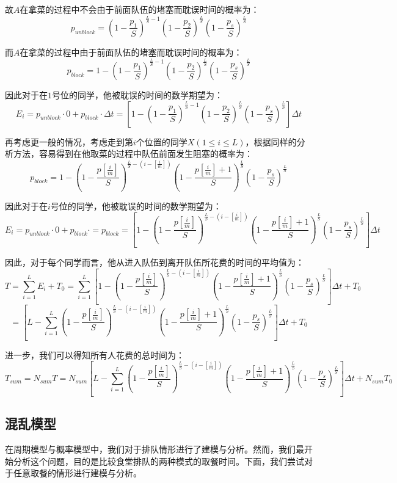 \documentclass[lang=cn,10pt,a4paper]{elegantpaper}
\begin{document}
故$A$在拿菜的过程中不会由于前面队伍的堵塞而耽误时间的概率为：
$$
p_{unblock} = (1-\frac{p_1}{S})^{\frac{L}{S}-1}(1-\frac{p_2}{S})^{\frac{L}{S}}(1-\frac{p_s}{S})^{\frac{L}{S}}
$$


而$A$在拿菜的过程中由于前面队伍的堵塞而耽误时间的概率为：
$$
p_{block} = 1-(1-\frac{p_1}{S})^{\frac{L}{S}-1}(1-\frac{p_2}{S})^{\frac{L}{S}}(1-\frac{p_s}{S})^{\frac{L}{S}}
$$


因此对于在$1$号位的同学，他被耽误的时间的数学期望为：
$$
E_i=p_{unblock} \cdot 0+p_{block} \cdot \Delta t = [1-(1-\frac{p_1}{S})^{\frac{L}{S}-1}(1-\frac{p_2}{S})^{\frac{L}{S}}(1-\frac{p_s}{S})^{\frac{L}{S}}]\Delta t
$$


再考虑更一般的情况，考虑走到第$i$个位置的同学$X(1 \leqslant i \leqslant L)$，根据同样的分析方法，容易得到在他取菜的过程中队伍前面发生阻塞的概率为：
$$
p_{block} = 1-(1-\frac{p[\frac{i}{m}]}{S})^{\frac{L}{S}-(i-[\frac{i}{m}])}(1-\frac{p[\frac{i}{m}]+1}{S})^{\frac{L}{S}}(1-\frac{p_s}{S})^{\frac{L}{S}}
$$


因此对于在$i$号位的同学，他被耽误的时间的数学期望为：
$$
E_i=p_{unblock} \cdot 0+p_{block} \cdot = p_{block} = [1-(1-\frac{p[\frac{i}{m}]}{S})^{\frac{L}{S}-(i-[\frac{i}{m}])}(1-\frac{p[\frac{i}{m}]+1}{S})^{\frac{L}{S}}(1-\frac{p_s}{S})^{\frac{L}{S}}]\Delta t
$$


因此，对于每个同学而言，他从进入队伍到离开队伍所花费的时间的平均值为：
$$
T=\sum_{i=1}^LE_i + T_0=\sum_{i=1}^L[1-(1-\frac{p[\frac{i}{m}]}{S})^{\frac{L}{S}-(i-[\frac{i}{m}])}(1-\frac{p[\frac{i}{m}]+1}{S})^{\frac{L}{S}}(1-\frac{p_s}{S})^{\frac{L}{S}}]\Delta t + T_0
$$
$$
=[L-\sum_{i=1}^{L}(1-\frac{p[\frac{i}{m}]}{S})^{\frac{L}{S}-(i-[\frac{i}{m}])}(1-\frac{p[\frac{i}{m}]+1}{S})^{\frac{L}{S}}(1-\frac{p_s}{S})^{\frac{L}{S}}]\Delta t + T_0
$$


进一步，我们可以得知所有人花费的总时间为：
\begin{equation}
T_{sum}=N_{sum}T=N_{sum}[L-\sum_{i=1}^{L}(1-\frac{p[\frac{i}{m}]}{S})^{\frac{L}{S}-(i-[\frac{i}{m}])}(1-\frac{p[\frac{i}{m}]+1}{S})^{\frac{L}{S}}(1-\frac{p_s}{S})^{\frac{L}{S}}]\Delta t + N_{sum}T_0
\end{equation}


\subsection{混乱模型}
在周期模型与概率模型中，我们对于排队情形进行了建模与分析。然而，我们最开始分析这个问题，目的是比较食堂排队的两种模式的取餐时间。下面，我们尝试对于任意取餐的情形进行建模与分析。
\end{document}

